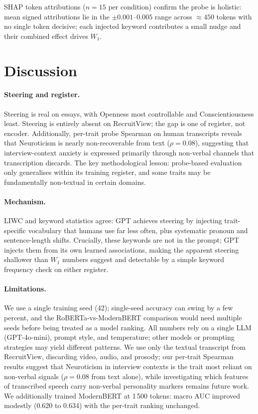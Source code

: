 \documentclass[10pt, a4paper]{article}
\begin{document}
SHAP token attributions \citep{lundberg-lee-2017-shap} ($n=15$ per condition) confirm the probe is holistic: mean signed attributions lie in the $\pm 0.001$--$0.005$ range across ${\approx}450$ tokens with no single token decisive; each injected keyword contributes a small nudge and their combined effect drives $W_1$.

\section{Discussion}

\paragraph{Steering and register.} Steering is real on essays, with Openness most controllable and Conscientiousness least. Steering is entirely absent on RecruitView; the gap is one of register, not encoder. Additionally, per-trait probe Spearman on human transcripts reveals that Neuroticism is nearly non-recoverable from text ($\rho=0.08$), suggesting that interview-context anxiety is expressed primarily through non-verbal channels that transcription discards. The key methodological lesson: probe-based evaluation only generalises within its training register, and some traits may be fundamentally non-textual in certain domains.

\paragraph{Mechanism.} LIWC and keyword statistics agree: GPT achieves steering by injecting trait-specific vocabulary that humans use far less often, plus systematic pronoun and sentence-length shifts. Crucially, these keywords are not in the prompt; GPT injects them from its own learned associations, making the apparent steering shallower than $W_1$ numbers suggest and detectable by a simple keyword frequency check on either register.

\paragraph{Limitations.} We use a single training seed (42); single-seed accuracy can swing by a few percent, and the RoBERTa-vs-ModernBERT comparison would need multiple seeds before being treated as a model ranking. All numbers rely on a single LLM (GPT-4o-mini), prompt style, and temperature; other models or prompting strategies may yield different patterns. We use only the textual transcript from RecruitView, discarding video, audio, and prosody; our per-trait Spearman results suggest that Neuroticism in interview contexts is the trait most reliant on non-verbal signals ($\rho=0.08$ from text alone), while investigating which features of transcribed speech carry non-verbal personality markers remains future work. We additionally trained ModernBERT at 1\,500 tokens: macro AUC improved modestly (0.620 to 0.634) with the per-trait ranking unchanged.
\end{document}
